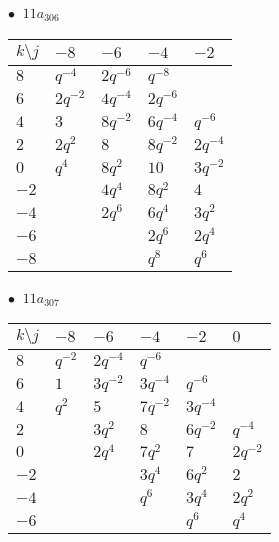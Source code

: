 \begin{minipage}{\linewidth}
$\bullet\ $ $11a_{306}$ \vspace{0.5em} \\
\begin{tabular}{l|llll}
$k \setminus j$ & $-8$ & $-6$ & $-4$ & $-2$ \\
\hline
$8$ & $q^{-4}$ & $2q^{-6}$ & $q^{-8}$ &  \\
$6$ & $2q^{-2}$ & $4q^{-4}$ & $2q^{-6}$ &  \\
$4$ & $3$ & $8q^{-2}$ & $6q^{-4}$ & $q^{-6}$ \\
$2$ & $2q^{2}$ & $8$ & $8q^{-2}$ & $2q^{-4}$ \\
$0$ & $q^{4}$ & $8q^{2}$ & $10$ & $3q^{-2}$ \\
$-2$ &  & $4q^{4}$ & $8q^{2}$ & $4$ \\
$-4$ &  & $2q^{6}$ & $6q^{4}$ & $3q^{2}$ \\
$-6$ &  &  & $2q^{6}$ & $2q^{4}$ \\
$-8$ &  &  & $q^{8}$ & $q^{6}$ \\
\end{tabular}
\vspace{2em}
\end{minipage}
%
\begin{minipage}{\linewidth}
$\bullet\ $ $11a_{307}$ \vspace{0.5em} \\
\begin{tabular}{l|lllll}
$k \setminus j$ & $-8$ & $-6$ & $-4$ & $-2$ & $0$ \\
\hline
$8$ & $q^{-2}$ & $2q^{-4}$ & $q^{-6}$ &  &  \\
$6$ & $1$ & $3q^{-2}$ & $3q^{-4}$ & $q^{-6}$ &  \\
$4$ & $q^{2}$ & $5$ & $7q^{-2}$ & $3q^{-4}$ &  \\
$2$ &  & $3q^{2}$ & $8$ & $6q^{-2}$ & $q^{-4}$ \\
$0$ &  & $2q^{4}$ & $7q^{2}$ & $7$ & $2q^{-2}$ \\
$-2$ &  &  & $3q^{4}$ & $6q^{2}$ & $2$ \\
$-4$ &  &  & $q^{6}$ & $3q^{4}$ & $2q^{2}$ \\
$-6$ &  &  &  & $q^{6}$ & $q^{4}$ \\
\end{tabular}
\vspace{2em}
\end{minipage}
%
